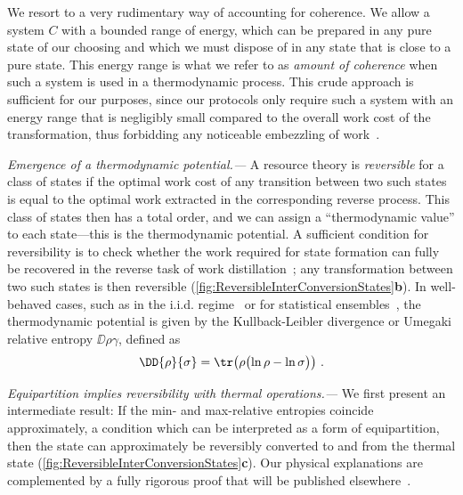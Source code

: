 \documentclass[prl,reprint,longbibliography,superscriptaddress]{revtex4-1}
\newcommand{\DKL}{\DD}
\renewcommand\paragraph[1]{%
  \par\emph{#1.---}\kern2pt\relax\ignorespaces}
\begin{document}
We resort to a very rudimentary way of accounting for coherence.  We allow a
system $C$ with a bounded range of energy, which can be prepared in any pure
state of our choosing and which we must dispose of in any state that is close to
a pure state.  This energy range is what we refer to as \emph{amount of
  coherence} when such a system is used in a thermodynamic process.  This crude
approach is sufficient for our purposes, since our protocols only require such a
system with an energy range that is negligibly small compared to the overall
work cost of the transformation, thus forbidding any noticeable embezzling of
work~\cite{Brandao2015PNAS_secondlaws}.



\paragraph{Emergence of a thermodynamic potential}%
A resource theory is
\emph{reversible} for a class of states if the optimal work cost of any
transition between two such states is equal to the optimal work extracted in the
corresponding reverse process.  This class of states then has a total order, and
we can assign a ``thermodynamic value'' to each state---this is the
thermodynamic potential.
%
A sufficient condition for reversibility is to check whether the work required
for state formation can fully be recovered in the reverse task of work
distillation~\cite{Horodecki2013_ThermoMaj}; any transformation between two such
states is then reversible
(\cref{fig:ReversibleInterConversionStates}\textbf{b}).
%
In well-behaved cases, such as in the i.i.d.\@
regime~\cite{Brandao2013_resource} or for statistical
ensembles~\cite{Weilenmann2018arXiv_smooth}, the thermodynamic potential is
given by the Kullback-Leibler divergence or Umegaki relative entropy
$\DKL{\rho}{\gamma}$, defined as
\begin{align}
  \DKL{\rho}{\sigma} = \tr\bigl( \rho\bigl(\ln\rho - \ln\sigma\bigr) \bigr)\ .
  \label{eq:KL-div-defn}
\end{align}

\paragraph{Equipartition implies reversibility with thermal operations}%
We first present an intermediate result: If the min- and max-relative entropies
coincide approximately, a condition which can be interpreted as a form of
equipartition, then the state can approximately be reversibly converted to and
from the thermal state (\cref{fig:ReversibleInterConversionStates}\textbf{c}).
Our physical explanations are complemented by a fully rigorous proof that will
be published elsewhere~\cite{Sagawa-CMP-inprep}.
\end{document}
